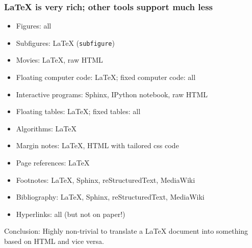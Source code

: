 \documentclass{beamer}
\begin{document}
\begin{frame}
\frametitle{{\LaTeX} is very rich; other tools support much less}

\pause
\begin{block}{}
\begin{itemize}
 \item Figures: all

 \item Subfigures: {\LaTeX} (\Verb!subfigure!)

 \item Movies: {\LaTeX}, raw HTML

 \item Floating computer code: {\LaTeX}; fixed computer code: all

 \item Interactive programs: Sphinx, IPython notebook, raw HTML

 \item Floating tables: {\LaTeX}; fixed tables: all

 \item Algorithms: {\LaTeX}

 \item Margin notes: {\LaTeX}, HTML with tailored css code

 \item Page references: {\LaTeX}

 \item Footnotes: {\LaTeX}, Sphinx, reStructuredText, MediaWiki

 \item Bibliography: {\LaTeX}, Sphinx, reStructuredText, MediaWiki

 \item Hyperlinks: all (but not on paper!)
\end{itemize}

\noindent
\end{block}



\pause
\begin{block}{}
Conclusion: Highly non-trivial to translate a {\LaTeX} document into something
based on HTML and vice versa.
\end{block}
\end{frame}
\end{document}
